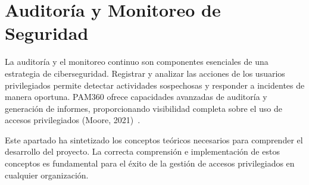 \section{Auditoría y Monitoreo de Seguridad}

La auditoría y el monitoreo continuo son componentes esenciales de una estrategia de ciberseguridad. Registrar y analizar las acciones de los usuarios privilegiados permite detectar actividades sospechosas y responder a incidentes de manera oportuna. PAM360 ofrece capacidades avanzadas de auditoría y generación de informes, proporcionando visibilidad completa sobre el uso de accesos privilegiados (Moore, 2021)~\cite{moore2021monitoring}.

Este apartado ha sintetizado los conceptos teóricos necesarios para comprender el desarrollo del proyecto. La correcta comprensión e implementación de estos conceptos es fundamental para el éxito de la gestión de accesos privilegiados en cualquier organización.
